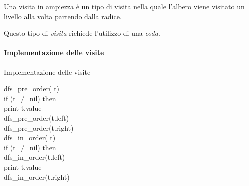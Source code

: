 \begin{definition}
    Una visita in ampiezza è un tipo di visita nella quale l'albero viene
    visitato un livello alla volta partendo dalla radice. 
\end{definition}
\begin{note}
    Questo tipo di \emph{visita} richiede l'utilizzo di una \emph{coda}.
\end{note}

\paragraph{Implementazione delle visite}
\begin{code}{Implementazione delle visite}
    \begin{minipage}[t]{0.48\textwidth}
        \rmbreak\ind dfs\_pre\_order( t)\\
            \indf if (t $\neq$ nil) then\\
                print t.value\\
                dfs\_pre\_order(t.left)\\
                dfs\_pre\_order(t.right)\\

        \noindent{}
        \rmbreak\ind dfs\_in\_order( t)\\
            \indf if (t $\neq$ nil) then\\
                dfs\_in\_order(t.left)\\
                print t.value\\
                dfs\_in\_order(t.right)\\


\end{minipage}
\end{code}
